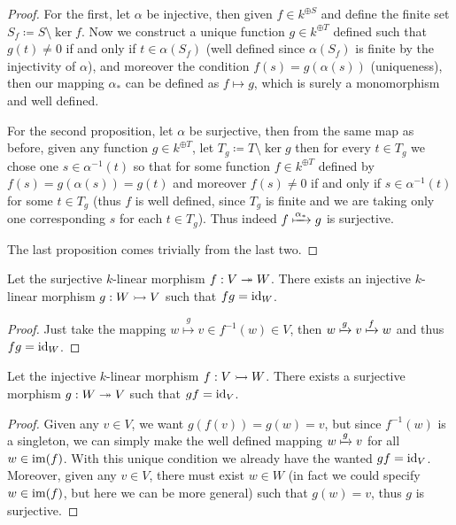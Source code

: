 \begin{proof}
    For the first, let \(\alpha\) be injective, then given \(f \in k^{\oplus S}\)
    and define the finite set \(S_f \coloneq S \setminus \ker f\). Now we construct a
    unique function \(g \in k^{\oplus T}\) defined such that \(g(t) \neq 0\) if and only if
    \(t \in \alpha(S_f)\) (well defined since \(\alpha(S_f)\) is finite by the
    injectivity of \(\alpha\)), and moreover the condition \(f(s) =
    g(\alpha(s))\) (uniqueness), then our mapping \(\alpha_{\ast}\) can be
    defined as \(f \mapsto g\), which is surely a monomorphism and well defined.

    For the second proposition, let \(\alpha\) be surjective, then from the same
    map as before, given any function \(g \in k^{\oplus T}\), let  \(T_g \coloneq T
    \setminus \ker g\) then for every \(t \in T_g\) we chose one \(s \in
    \alpha^{-1}(t)\) so that for some function \(f \in k^{\oplus T}\) defined by
    \(f(s) = g(\alpha(s)) = g(t)\) and moreover \(f(s) \neq 0\) if and only if \(s \in
    \alpha^{-1}(t)\) for some \(t \in T_g\) (thus \(f\) is well defined, since
    \(T_g\) is finite and we are taking only one corresponding \(s\) for each \(t
    \in T_g\)). Thus indeed \(f \xmapsto{\alpha_\ast} g\) is surjective.

    The last proposition comes trivially from the last two.
\end{proof}

\begin{proposition}
    Let the surjective \(k\)-linear morphism \(f: V \twoheadrightarrow W\). There
    exists an injective \(k\)-linear morphism \(g: W \rightarrowtail V\) such
    that \(f  g = \operatorname{id}_{W}\).
\end{proposition}

\begin{proof}
    Just take the mapping \(w \overset g \longmapsto v \in f^{-1}(w) \in V\), then
    \(w \xmapsto g v \xmapsto f w\) and thus \(f  g = \operatorname{id}_W\).
\end{proof}

\begin{proposition}
    Let the injective \(k\)-linear morphism \(f: V \rightarrowtail W\). There
    exists a surjective morphism \(g : W \twoheadrightarrow V\) such that \(g
    f = \operatorname{id}_V\).
\end{proposition}

\begin{proof}
    Given any \(v \in V\), we want \(g(f(v)) = g(w) = v\), but since \(f^{-1}(w)\)
    is a singleton, we can simply make the well defined mapping \(w \xmapsto g v\)
    for all \(w \in \operatorname{im}(f)\). With this unique condition we already have the
    wanted \(g  f = \operatorname{id}_V\). Moreover, given any \(v \in V\), there must
    exist \(w \in W\) (in fact we could specify \(w \in \operatorname{im}(f)\), but here we can
    be more general) such that \(g(w) = v\), thus \(g\) is surjective.
\end{proof}

